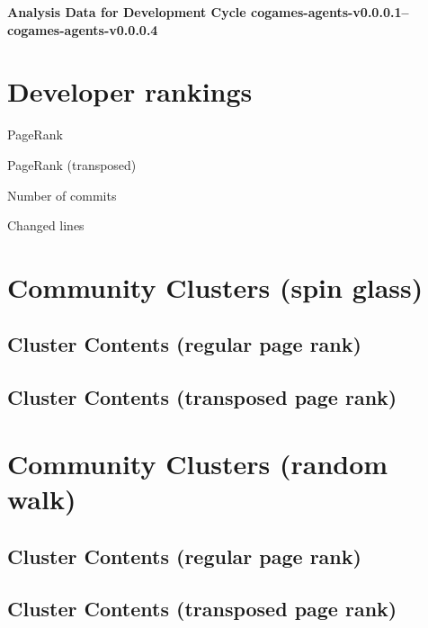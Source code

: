 \documentclass{article}
\begin{document}
\setlength{\parindent}{0pt}
\begin{center}
\begin{Large}
\textbf{Analysis Data for Development Cycle cogames-agents-v0.0.0.1--cogames-agents-v0.0.0.4}
\end{Large}
\end{center}
\section{Developer rankings}
\begin{small}\renewcommand{\tabcolsep}{1pt}
\begin{minipage}{0.5\linewidth}
PageRank\\

\end{minipage}%
\begin{minipage}{0.5\linewidth}
PageRank (transposed)\\

\end{minipage}

\renewcommand{\tabcolsep}{5pt}
\begin{minipage}{0.5\linewidth}
Number of commits\\

\end{minipage}%
\begin{minipage}{0.5\linewidth}
Changed lines\\

\end{minipage}
\end{small}
\newpage\section{Community Clusters (spin glass)}
\subsection{Cluster Contents (regular page rank)}
\newpage\subsection{Cluster Contents (transposed page rank)}
\newpage\section{Community Clusters (random walk)}
\subsection{Cluster Contents (regular page rank)}
\newpage\subsection{Cluster Contents (transposed page rank)}
\end{document}
